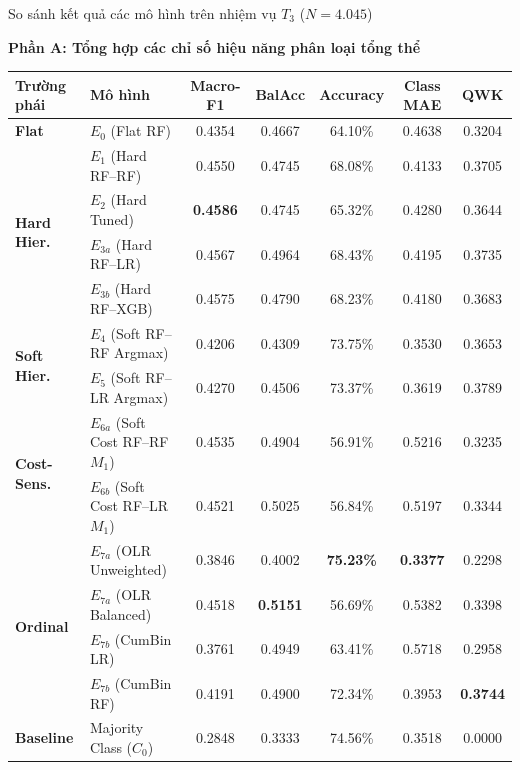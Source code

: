 \begin{table}{So sánh kết quả các mô hình trên nhiệm vụ $T_3$ ($N = 4.045$)}
\centering
\footnotesize
\setlength{\tabcolsep}{4pt}
\label{tab:master-comparison}

\vspace{-0.1cm}
\textbf{Phần A: Tổng hợp các chỉ số hiệu năng phân loại tổng thể}
\vspace{0.15cm}

\begin{tabularx}{\textwidth}{l X c c c c c}
\toprule
\textbf{Trường phái} & \textbf{Mô hình} & \textbf{Macro-F1} & \textbf{BalAcc} & \textbf{Accuracy} & \textbf{Class MAE} & \textbf{QWK} \\
\midrule
\textbf{Flat} & $E_0$ (Flat RF) & 0.4354 & 0.4667 & 64.10\% & 0.4638 & 0.3204 \\
\midrule
\multirow{4}{*}{\textbf{Hard Hier.}} 
  & $E_1$ (Hard RF--RF)   & 0.4550 & 0.4745 & 68.08\% & 0.4133 & 0.3705 \\
  & $E_2$ (Hard Tuned)    & \textbf{0.4586} & 0.4745 & 65.32\% & 0.4280 & 0.3644 \\
  & $E_{3a}$ (Hard RF--LR) & 0.4567 & 0.4964 & 68.43\% & 0.4195 & 0.3735 \\
  & $E_{3b}$ (Hard RF--XGB)& 0.4575 & 0.4790 & 68.23\% & 0.4180 & 0.3683 \\
\midrule
\multirow{2}{*}{\textbf{Soft Hier.}} 
  & $E_4$ (Soft RF--RF Argmax) & 0.4206 & 0.4309 & 73.75\% & 0.3530 & 0.3653 \\
  & $E_5$ (Soft RF--LR Argmax) & 0.4270 & 0.4506 & 73.37\% & 0.3619 & 0.3789 \\
\midrule
\multirow{2}{*}{\textbf{Cost-Sens.}}
  & $E_{6a}$ (Soft Cost RF--RF $M_1$) & 0.4535 & 0.4904 & 56.91\% & 0.5216 & 0.3235 \\
  & $E_{6b}$ (Soft Cost RF--LR $M_1$) & 0.4521 & 0.5025 & 56.84\% & 0.5197 & 0.3344 \\
\midrule
\multirow{4}{*}{\textbf{Ordinal}} 
  & $E_{7a}$ (OLR Unweighted) & 0.3846 & 0.4002 & \textbf{75.23\%} & \textbf{0.3377} & 0.2298 \\
  & $E_{7a}$ (OLR Balanced)   & 0.4518 & \textbf{0.5151} & 56.69\% & 0.5382 & 0.3398 \\
  & $E_{7b}$ (CumBin LR)      & 0.3761 & 0.4949 & 63.41\% & 0.5718 & 0.2958 \\
  & $E_{7b}$ (CumBin RF)      & 0.4191 & 0.4900 & 72.34\% & 0.3953 & \textbf{0.3744} \\
\midrule
\textbf{Baseline} & Majority Class ($C_0$) & 0.2848 & 0.3333 & 74.56\% & 0.3518 & 0.0000 \\
\bottomrule
\end{tabularx}


\end{table}
